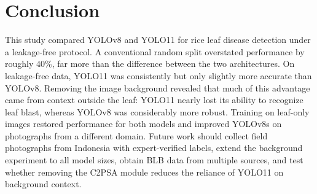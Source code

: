 \documentclass[conference]{IEEEtran}
\begin{document}
\section{Conclusion}

This study compared YOLOv8 and YOLO11 for rice leaf disease detection under a leakage-free protocol. A conventional random split overstated performance by roughly 40\%, far more than the difference between the two architectures. On leakage-free data, YOLO11 was consistently but only slightly more accurate than YOLOv8. Removing the image background revealed that much of this advantage came from context outside the leaf: YOLO11 nearly lost its ability to recognize leaf blast, whereas YOLOv8 was considerably more robust. Training on leaf-only images restored performance for both models and improved YOLOv8s on photographs from a different domain. Future work should collect field photographs from Indonesia with expert-verified labels, extend the background experiment to all model sizes, obtain BLB data from multiple sources, and test whether removing the C2PSA module reduces the reliance of YOLO11 on background context.




\end{document}
